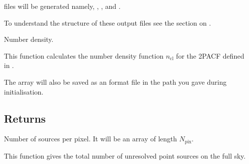 \documentclass[letterpaper,10pt,english]{sphinxmanual}
\begin{document}
\begin{fulllineitems}
\begin{fulllineitems}
\begin{description}
\end{description}

 files will be generated namely, , , and .

\sphinxAtStartPar
To understand the structure of these output files see the section on {\hyperref[\detokenize{detexp:gen-freq}]{}}.

\end{fulllineitems}


\begin{fulllineitems}
\label{\detokenize{api:furs.furs.num_den}}
\pysigstartsignatures
{}
\pysigstopsignatures
\sphinxAtStartPar
Number density.

\sphinxAtStartPar
This function calculates the number density function \(n_{\mathrm{cl}}\) for the 2PACF defined in .

\sphinxAtStartPar
The array will also be saved as an  format file in the path you gave during initialisation.


\subsection{Returns}
\label{\detokenize{api:id7}}\begin{description}
\sphinxAtStartPar
Number of sources per pixel. It will be an array of length \(N_{\mathrm{pix}}\).

\end{description}

\end{fulllineitems}


\begin{fulllineitems}
\label{\detokenize{api:furs.furs.num_sources}}
\pysigstartsignatures
{}
\pysigstopsignatures
\sphinxAtStartPar
This function gives the total number of unresolved point sources on the full sky.


\end{fulllineitems}
\end{fulllineitems}
\end{document}
